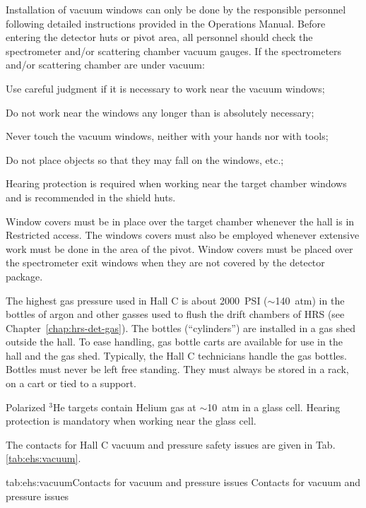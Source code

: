 Installation of vacuum windows can only be done by the responsible personnel following
detailed instructions provided in the Operations Manual.
Before entering the detector huts or pivot area, all personnel should
check the spectrometer and/or scattering chamber vacuum gauges. If the spectrometers 
and/or scattering chamber are under vacuum:
 \begin{list}{--}{\setlength{\itemsep}{-0.cm}}
    \item Use careful judgment if it is necessary to work near the vacuum windows;
    \item Do not work near the windows any longer than is absolutely necessary;
    \item Never touch the vacuum windows, neither with your hands nor with tools;
    \item Do not place objects so that they may fall on the windows, etc.;
    \item Hearing protection is required when working near the target chamber windows and 
          is recommended in the shield huts.
 \end{list}

Window covers must be in place over the target chamber whenever the hall is in
Restricted access. The windows covers must also be employed whenever extensive 
work must be done in the area of the pivot.
Window covers must be placed over the spectrometer exit windows when they are
not covered by the detector package.

The highest gas pressure used in Hall C is about 2000~PSI ($\sim$140~atm) in the bottles
of argon and other gasses used to flush the drift chambers of HRS 
(see Chapter~\ref{chap:hrs-det-gas}). The bottles (``cylinders'') are installed
in a gas shed outside the hall. To ease handling, gas bottle carts are available for use 
in the hall and the gas shed. Typically, the Hall C technicians handle the gas bottles. 
Bottles must never be left free standing. They must always be stored in a rack, 
on a cart or tied to a support.

Polarized $^3$He targets contain Helium gas at $\sim$10~atm in a glass cell.
Hearing protection is mandatory when working near the glass 
cell.   
 
 The contacts for Hall C vacuum and pressure safety issues are given in Tab.\ref{tab:ehs:vacuum}.
 
 \begin{namestab}{tab:ehs:vacuum}{Contacts for vacuum and pressure issues}{%
   Contacts for vacuum and pressure issues}
 \end{namestab}

